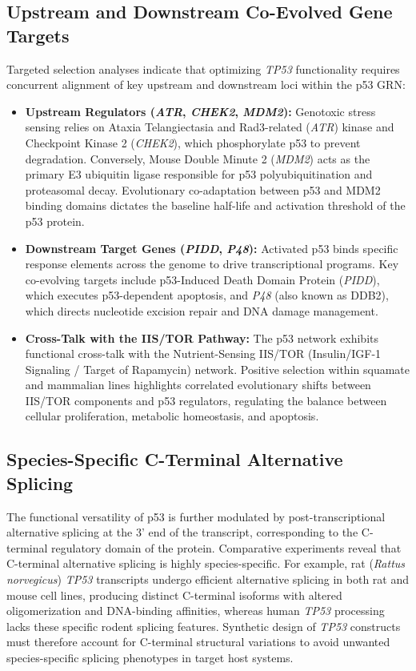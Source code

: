 \documentclass[11pt,a4paper]{article}
\begin{document}
\subsection{Upstream and Downstream Co-Evolved Gene Targets}
Targeted selection analyses indicate that optimizing \textit{TP53} functionality requires concurrent alignment of key upstream and downstream loci within the p53 GRN:
\begin{itemize}
    \item \textbf{Upstream Regulators (\textit{ATR}, \textit{CHEK2}, \textit{MDM2}):} Genotoxic stress sensing relies on Ataxia Telangiectasia and Rad3-related (\textit{ATR}) kinase and Checkpoint Kinase 2 (\textit{CHEK2}), which phosphorylate p53 to prevent degradation. Conversely, Mouse Double Minute 2 (\textit{MDM2}) acts as the primary E3 ubiquitin ligase responsible for p53 polyubiquitination and proteasomal decay. Evolutionary co-adaptation between p53 and MDM2 binding domains dictates the baseline half-life and activation threshold of the p53 protein.
    \item \textbf{Downstream Target Genes (\textit{PIDD}, \textit{P48}):} Activated p53 binds specific response elements across the genome to drive transcriptional programs. Key co-evolving targets include p53-Induced Death Domain Protein (\textit{PIDD}), which executes p53-dependent apoptosis, and \textit{P48} (also known as DDB2), which directs nucleotide excision repair and DNA damage management.
    \item \textbf{Cross-Talk with the IIS/TOR Pathway:} The p53 network exhibits functional cross-talk with the Nutrient-Sensing IIS/TOR (Insulin/IGF-1 Signaling / Target of Rapamycin) network. Positive selection within squamate and mammalian lines highlights correlated evolutionary shifts between IIS/TOR components and p53 regulators, regulating the balance between cellular proliferation, metabolic homeostasis, and apoptosis.
\end{itemize}

\subsection{Species-Specific C-Terminal Alternative Splicing}
The functional versatility of p53 is further modulated by post-transcriptional alternative splicing at the 3' end of the transcript, corresponding to the C-terminal regulatory domain of the protein. Comparative experiments reveal that C-terminal alternative splicing is highly species-specific. For example, rat (\textit{Rattus norvegicus}) \textit{TP53} transcripts undergo efficient alternative splicing in both rat and mouse cell lines, producing distinct C-terminal isoforms with altered oligomerization and DNA-binding affinities, whereas human \textit{TP53} processing lacks these specific rodent splicing features. Synthetic design of \textit{TP53} constructs must therefore account for C-terminal structural variations to avoid unwanted species-specific splicing phenotypes in target host systems.
\end{document}
